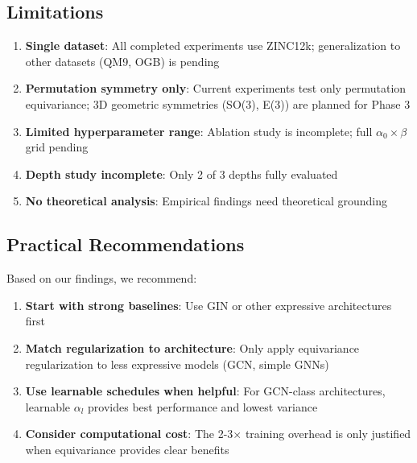 \documentclass[11pt,a4paper]{article}
\begin{document}
\subsection{Limitations}

\begin{enumerate}
    \item \textbf{Single dataset}: All completed experiments use ZINC12k; generalization to other datasets (QM9, OGB) is pending
    
    \item \textbf{Permutation symmetry only}: Current experiments test only permutation equivariance; 3D geometric symmetries (SO(3), E(3)) are planned for Phase 3
    
    \item \textbf{Limited hyperparameter range}: Ablation study is incomplete; full $\alpha_0 \times \beta$ grid pending
    
    \item \textbf{Depth study incomplete}: Only 2 of 3 depths fully evaluated
    
    \item \textbf{No theoretical analysis}: Empirical findings need theoretical grounding
\end{enumerate}

\subsection{Practical Recommendations}

Based on our findings, we recommend:

\begin{enumerate}
    \item \textbf{Start with strong baselines}: Use GIN or other expressive architectures first
    
    \item \textbf{Match regularization to architecture}: Only apply equivariance regularization to less expressive models (GCN, simple GNNs)
    
    \item \textbf{Use learnable schedules when helpful}: For GCN-class architectures, learnable $\alpha_l$ provides best performance and lowest variance
    
    \item \textbf{Consider computational cost}: The 2-3$\times$ training overhead is only justified when equivariance provides clear benefits
\end{enumerate}
\end{document}
